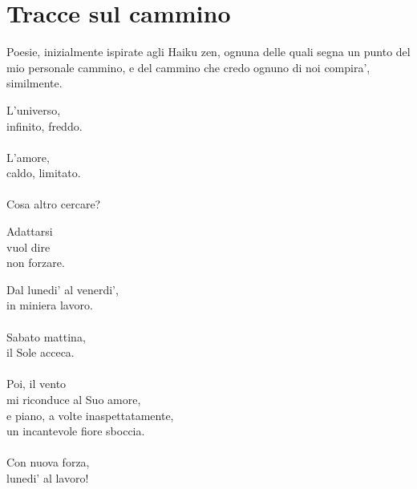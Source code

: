 \chapter{Tracce sul cammino}

Poesie, inizialmente ispirate agli Haiku zen, ognuna delle quali segna un punto del mio personale cammino, e del cammino che credo ognuno di noi compira', similmente.

\vfill

\begin{haiku}
L'universo,\\
infinito, freddo.\\
\leavevmode\\
L'amore,\\
caldo, limitato.\\
\leavevmode\\
Cosa altro cercare?\\
\end{haiku}


\begin{haiku}
Adattarsi \\
vuol dire\\
non forzare.\\
\end{haiku}

\begin{haiku}
Dal lunedi' al venerdi',\\
in miniera lavoro.\\
\leavevmode\\
Sabato mattina,\\
il Sole acceca.\\
\leavevmode\\
Poi, il vento\\
mi riconduce al Suo amore,\\
e piano, a volte inaspettatamente,\\
un incantevole fiore sboccia.\\
\leavevmode\\
Con nuova forza,\\
lunedi' al lavoro!\\
\end{haiku}

